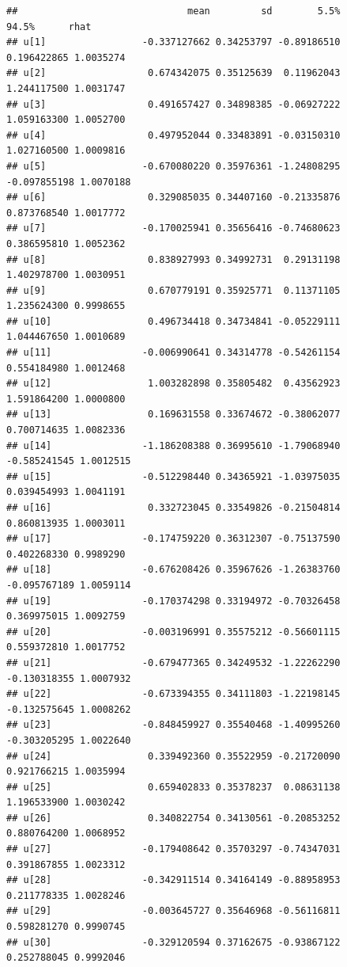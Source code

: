 \documentclass[
]{book}
\begin{document}
\begin{verbatim}
##                              mean         sd        5.5%        94.5%      rhat
## u[1]                 -0.337127662 0.34253797 -0.89186510  0.196422865 1.0035274
## u[2]                  0.674342075 0.35125639  0.11962043  1.244117500 1.0031747
## u[3]                  0.491657427 0.34898385 -0.06927222  1.059163300 1.0052700
## u[4]                  0.497952044 0.33483891 -0.03150310  1.027160500 1.0009816
## u[5]                 -0.670080220 0.35976361 -1.24808295 -0.097855198 1.0070188
## u[6]                  0.329085035 0.34407160 -0.21335876  0.873768540 1.0017772
## u[7]                 -0.170025941 0.35656416 -0.74680623  0.386595810 1.0052362
## u[8]                  0.838927993 0.34992731  0.29131198  1.402978700 1.0030951
## u[9]                  0.670779191 0.35925771  0.11371105  1.235624300 0.9998655
## u[10]                 0.496734418 0.34734841 -0.05229111  1.044467650 1.0010689
## u[11]                -0.006990641 0.34314778 -0.54261154  0.554184980 1.0012468
## u[12]                 1.003282898 0.35805482  0.43562923  1.591864200 1.0000800
## u[13]                 0.169631558 0.33674672 -0.38062077  0.700714635 1.0082336
## u[14]                -1.186208388 0.36995610 -1.79068940 -0.585241545 1.0012515
## u[15]                -0.512298440 0.34365921 -1.03975035  0.039454993 1.0041191
## u[16]                 0.332723045 0.33549826 -0.21504814  0.860813935 1.0003011
## u[17]                -0.174759220 0.36312307 -0.75137590  0.402268330 0.9989290
## u[18]                -0.676208426 0.35967626 -1.26383760 -0.095767189 1.0059114
## u[19]                -0.170374298 0.33194972 -0.70326458  0.369975015 1.0092759
## u[20]                -0.003196991 0.35575212 -0.56601115  0.559372810 1.0017752
## u[21]                -0.679477365 0.34249532 -1.22262290 -0.130318355 1.0007932
## u[22]                -0.673394355 0.34111803 -1.22198145 -0.132575645 1.0008262
## u[23]                -0.848459927 0.35540468 -1.40995260 -0.303205295 1.0022640
## u[24]                 0.339492360 0.35522959 -0.21720090  0.921766215 1.0035994
## u[25]                 0.659402833 0.35378237  0.08631138  1.196533900 1.0030242
## u[26]                 0.340822754 0.34130561 -0.20853252  0.880764200 1.0068952
## u[27]                -0.179408642 0.35703297 -0.74347031  0.391867855 1.0023312
## u[28]                -0.342911514 0.34164149 -0.88958953  0.211778335 1.0028246
## u[29]                -0.003645727 0.35646968 -0.56116811  0.598281270 0.9990745
## u[30]                -0.329120594 0.37162675 -0.93867122  0.252788045 0.9992046

\end{verbatim}
\end{document}
